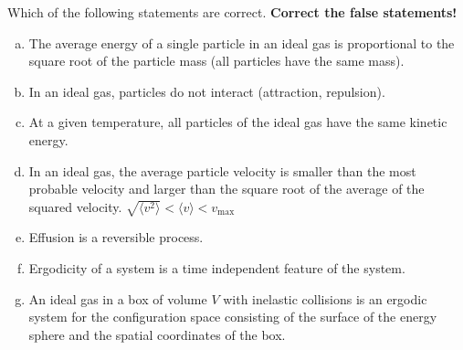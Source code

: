 \documentclass[12pt,a4paper]{article} %
\begin{document}
Which of the following statements are correct. \textbf{Correct the false statements!}
\begin{enumerate}[a)]
  \item The average energy of a single particle in an ideal gas is proportional to the square root of the particle mass (all particles have the same mass).
  \item In an ideal gas, particles do not interact (attraction, repulsion).
  \item At a given temperature, all particles of the ideal gas have the same kinetic energy.
  \item In an ideal gas, the average particle velocity is smaller than the most probable velocity and larger than the square root of the average of the squared velocity.
  $ \sqrt{\langle v^2\rangle} < \langle v \rangle < v_\textrm{max} $
  \item Effusion is a reversible process.
  \item Ergodicity of a system is a time independent feature of the system.
  \item An ideal gas in a box of volume $V$ with inelastic collisions is an ergodic system for the configuration space consisting of the surface of the energy sphere and the spatial coordinates of the box.
%  


\end{enumerate}
\end{document}
